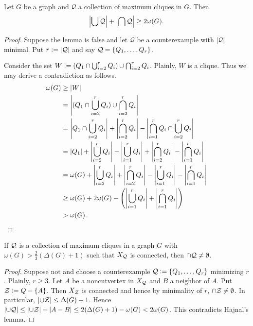 \begin{lem}\label{HajnalLemma}
Let $G$ be a graph and $\mathcal{Q}$ a collection of maximum cliques in $G$. Then
\[\left|\bigcup \mathcal{Q}\right| + \left|\bigcap \mathcal{Q}\right| \geq 2\omega(G).\]
\end{lem}
\begin{proof}
Suppose the lemma is false and let $\mathcal{Q}$ be a counterexample with $|\mathcal{Q}|$ minimal.  Put $r \mathrel{\mathop:}= \left|\mathcal{Q}\right|$ and say $\mathcal{Q} = \left\{ Q_1, \ldots, Q_r \right\}$.  

Consider the set $W \mathrel{\mathop:}= (Q_1 \cap \bigcup_{i=2}^r Q_i) \cup \bigcap_{i=2}^r Q_i$.  Plainly, $W$ is a clique.  Thus we may derive a contradiction as follows.
\begin{align*}
\omega(G) &\geq |W| \\
&= \left|(Q_1 \cap \bigcup_{i=2}^r Q_i) \cup \bigcap_{i=2}^r Q_i\right| \\
&= \left|Q_1 \cap \bigcup_{i=2}^r Q_i\right| + \left|\bigcap_{i=2}^r Q_i\right| - \left|\bigcap_{i=1}^r Q_i \cap \bigcup_{i=2}^r Q_i\right| \\
&= \left|Q_1\right| +\left|\bigcup_{i=2}^r Q_i\right| - \left|\bigcup_{i=1}^r Q_i\right| + \left|\bigcap_{i=2}^r Q_i\right| - \left|\bigcap_{i=1}^r Q_i\right| \\
&= \omega(G) +\left|\bigcup_{i=2}^r Q_i\right| + \left|\bigcap_{i=2}^r Q_i\right| - \left|\bigcup_{i=1}^r Q_i\right| - \left|\bigcap_{i=1}^r Q_i\right| \\
&\geq \omega(G) + 2\omega(G) - \left(\left|\bigcup_{i=1}^r Q_i\right| + \left|\bigcap_{i=1}^r Q_i\right|\right) \\
& > \omega(G).
\end{align*}
\end{proof}

\begin{lem}\label{KostochkaCliqueGraph}
If $\mathcal{Q}$ is a collection of maximum cliques in a graph $G$ with 
$\omega(G) > \frac23 (\Delta(G) + 1)$ such that $X_{\mathcal{Q}}$ is connected, then $\cap \mathcal{Q} \neq \emptyset$. 
\end{lem}
\begin{proof}
Suppose not and choose a counterexample $\mathcal{Q} \mathrel{\mathop:}= \left\{ Q_1, \ldots, Q_r \right\}$ minimizing $r$. Plainly, $r \geq 3$. Let $A$ be a noncutvertex in $X_{\mathcal{Q}}$ and $B$ a neighbor of $A$. Put $\mathcal{Z} \mathrel{\mathop:}= Q - \left\{ A \right\}$. Then $X_{\mathcal{Z}}$ is connected and hence by minimality of $r$, $\cap \mathcal{Z} \neq \emptyset$. In particular, $\left|\cup \mathcal{Z}\right| \leq \Delta(G) + 1$. Hence $\left|\cup \mathcal{Q}\right| \leq \left|\cup \mathcal{Z}\right| + \left|A - B\right| \leq 2(\Delta(G) + 1) - \omega(G) < 2\omega(G)$. This contradicts Hajnal's lemma.
\end{proof}

